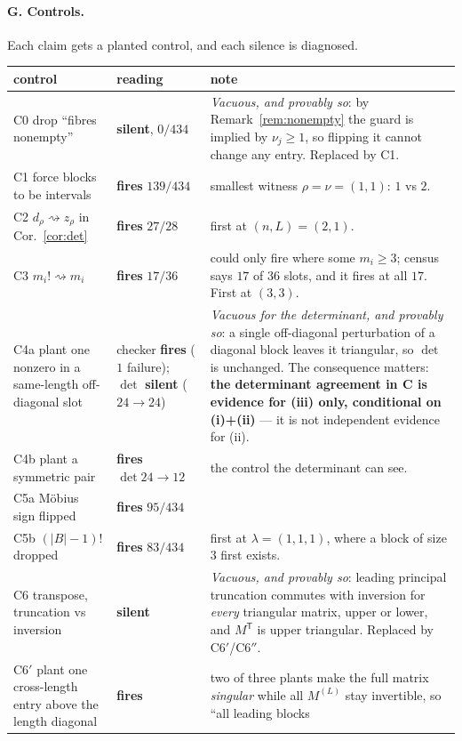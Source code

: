 \documentclass[11pt]{article}
\theoremstyle{definition}
\newcommand{\lam}{\lambda}
\begin{document}
\paragraph{G. Controls.} Each claim gets a planted control, and each silence is diagnosed.
\begin{center}
\small
\begin{tabular}{llp{5.4cm}}
\toprule
control & reading & note\\
\midrule
C0 drop ``fibres nonempty'' & \textbf{silent}, $0/434$ & \emph{Vacuous, and provably so}: by
Remark~\ref{rem:nonempty} the guard is implied by $\nu_j\ge1$, so flipping it cannot change any
entry. Replaced by C1.\\
C1 force blocks to be intervals & \textbf{fires} $139/434$ & smallest witness
$\rho=\nu=(1,1)$: $1$ vs $2$.\\
C2 $d_\rho\rightsquigarrow z_\rho$ in Cor.~\ref{cor:det} & \textbf{fires} $27/28$ & first at
$(n,L)=(2,1)$.\\
C3 $m_i!\rightsquigarrow m_i$ & \textbf{fires} $17/36$ & could only fire where some $m_i\ge3$;
census says $17$ of $36$ slots, and it fires at all $17$. First at $(3,3)$.\\
C4a plant one nonzero in a same-length off-diagonal slot & checker \textbf{fires} ($1$ failure);
$\det$ \textbf{silent} ($24\to24$) & \emph{Vacuous for the determinant, and provably so}: a single
off-diagonal perturbation of a diagonal block leaves it triangular, so $\det$ is unchanged. The
consequence matters: \textbf{the determinant agreement in C is evidence for (iii) only, conditional
on (i)+(ii)} --- it is not independent evidence for (ii).\\
C4b plant a symmetric pair & \textbf{fires} $\det 24\to12$ & the control the determinant can see.\\
C5a Möbius sign flipped & \textbf{fires} $95/434$ &\\
C5b $(|B|-1)!$ dropped & \textbf{fires} $83/434$ & first at $\lam=(1,1,1)$, where a block of size
$3$ first exists.\\
C6 transpose, truncation vs inversion & \textbf{silent} & \emph{Vacuous, and provably so}: leading
principal truncation commutes with inversion for \emph{every} triangular matrix, upper or lower, and
$M^{\mathsf T}$ is upper triangular. Replaced by C6$'$/C6$''$.\\
C6$'$ plant one cross-length entry above the length diagonal & \textbf{fires} & two of three plants
make the full matrix \emph{singular} while all $M^{(L)}$ stay invertible, so ``all leading blocks

\end{tabular}
\end{center}
\end{document}
